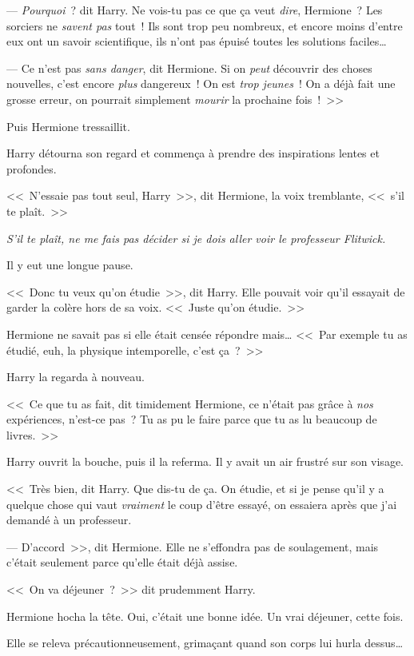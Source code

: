 --- \emph{Pourquoi}~? dit Harry. Ne vois-tu pas ce que ça veut \emph{dire}, Hermione~? Les sorciers ne \emph{savent pas} tout~! Ils sont trop peu nombreux, et encore moins d'entre eux ont un savoir scientifique, ils n'ont pas épuisé toutes les solutions faciles…

--- Ce n'est pas \emph{sans danger}, dit Hermione. Si on \emph{peut} découvrir des choses nouvelles, c'est encore \emph{plus} dangereux~! On est \emph{trop jeunes}~! On a déjà fait une grosse erreur, on pourrait simplement \emph{mourir} la prochaine fois~!~>>

Puis Hermione tressaillit.

Harry détourna son regard et commença à prendre des inspirations lentes et profondes.

<<~N'essaie pas tout seul, Harry~>>, dit Hermione, la voix tremblante, <<~s'il te plaît.~>>

\emph{S'il te plaît, ne me fais pas décider si je dois aller voir le professeur Flitwick.}

Il y eut une longue pause.

<<~Donc tu veux qu'on étudie~>>, dit Harry. Elle pouvait voir qu'il essayait de garder la colère hors de sa voix. <<~Juste qu'on étudie.~>>

Hermione ne savait pas si elle était censée répondre mais… <<~Par exemple tu as étudié, euh, la physique intemporelle, c'est ça~?~>>

Harry la regarda à nouveau.

<<~Ce que tu as fait, dit timidement Hermione, ce n'était pas grâce à \emph{nos} expériences, n'est-ce pas~? Tu as pu le faire parce que tu as lu beaucoup de livres.~>>

Harry ouvrit la bouche, puis il la referma. Il y avait un air frustré sur son visage.

<<~Très bien, dit Harry. Que dis-tu de ça. On étudie, et si je pense qu'il y a quelque chose qui vaut \emph{vraiment} le coup d'être essayé, on essaiera après que j'ai demandé à un professeur.

--- D'accord~>>, dit Hermione. Elle ne s'effondra pas de soulagement, mais c'était seulement parce qu'elle était déjà assise.

<<~On va déjeuner~?~>> dit prudemment Harry.

Hermione hocha la tête. Oui, c'était une bonne idée. Un vrai déjeuner, cette fois.

Elle se releva précautionneusement, grimaçant quand son corps lui hurla dessus…

